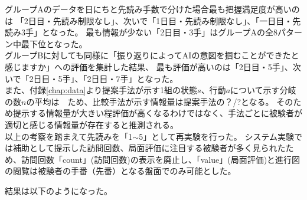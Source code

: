 グループAのデータを日にちと先読み手数で分けた場合最も把握満足度が高いのは
「2日目・先読み制限なし」、次いで「1日目・先読み制限なし」、「一日目・先読み3手」となった。
最も情報が少ない「2日目・3手」はグループAの全8パターン中最下位となった。\\


グループBに対しても同様に「振り返りによってAIの意図を掴むことができたと感じますか」への評価を集計した結果、
最も評価が高いのは「2日目・5手」、次いで「2日目・5手」、「2日目・7手」となった。\\



また、付録\ref{chap:data}より提案手法が示す1組の状態$s$、行動$a$について示す分岐の数$n$の平均は　ため、比較手法が示す情報量は提案手法の？/?となる。
そのため提示する情報量が大きい程評価が高くなるわけではなく、手法ごとに被験者が適切と感じる情報量が存在すると推測される。\\

以上の考察を踏まえて先読みを「1$\sim$5」として再実験を行った。
システム実験では補助として提示した訪問回数、局面評価に注目する被験者が多く見られたため、訪問回数「count」(訪問回数)の表示を廃止し、「value」(局面評価)と進行図の閲覧は被験者の手番（先番）となる盤面でのみ可能とした。

結果は以下のようになった。


